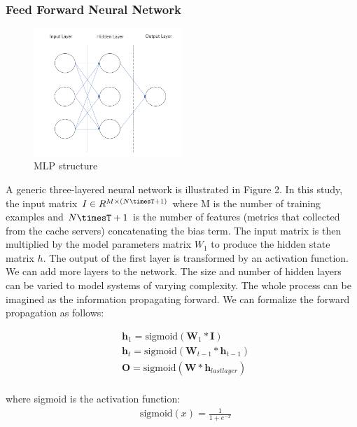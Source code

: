 \documentclass[5p]{elsarticle}
\begin{document}
\subsubsection{Feed Forward Neural Network}
\begin{figure}[h]
    \centering
    \includegraphics[width=0.5\textwidth]{mlp.png}
    \caption{MLP structure}
    \label{fig:RNN}
\end{figure}

A generic three-layered neural network is illustrated in Figure 2. In this study, the input matrix $I \in R^{M\times(N\timesT+1)}$  where M is the number of training examples and $N\timesT+1$ is the number of features (metrics that collected from the cache servers) concatenating the bias term. The input matrix is then multiplied by the model parameters matrix $W_1$ to produce the hidden state matrix $h$. The output of the first layer is transformed by an activation function. We can add more layers to the network. The size and number of hidden layers can be varied to model systems of varying complexity. The whole process can be imagined as the information propagating forward. We can formalize the forward propagation as follows:

\begin{equation}
    \begin{split}
    & \mathbf h_1 = \text{sigmoid}(\mathbf W_1 * \mathbf I) \\
    & \mathbf h_t = \text{sigmoid}(\mathbf W_{t-1} * \mathbf h_{t-1}) \\
    & \mathbf O=\text{sigmoid}(\mathbf W * \mathbf h_{lastlayer}) \\
    \end{split}
\end{equation}

where sigmoid is the activation function:
\begin{equation}
    \begin{split}
    & \text{sigmoid}(x)=\frac{1}{1+e^{-x}}
    \end{split}
\end{equation}
\end{document}
